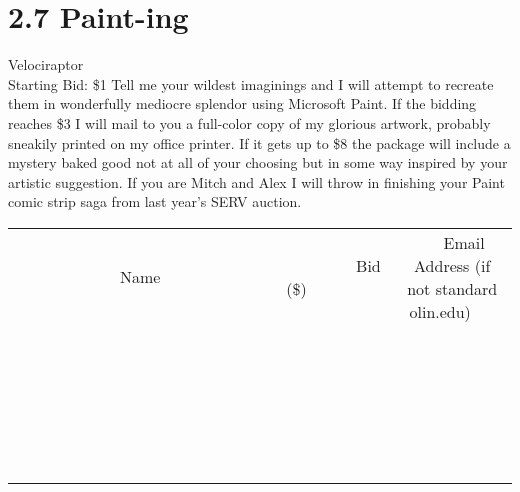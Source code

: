 \documentclass[11pt]{article}
\begin{document}
\section*{2.7 Paint-ing}
Velociraptor
\\
Starting Bid: \$1
\newline
Tell me your wildest imaginings and I will attempt to recreate them in wonderfully mediocre splendor using Microsoft Paint.  If the bidding reaches \$3 I will mail to you a full-color copy of my glorious artwork, probably sneakily printed on my office printer.  If it gets up to \$8 the package will include a mystery baked good not at all of your choosing but in some way inspired by your artistic suggestion. If you are Mitch and Alex I will throw in finishing your Paint comic strip saga from last year's SERV auction.
\\[6ex]
\begin{tabular}{c c c}
~~~~~~~~~~~~~Name~~~~~~~~~~~~~ & ~~~~~~~~~Bid (\$)~~~~~~~~~  & ~~~Email Address (if not standard olin.edu)~~~\\
 & & \\
\hline
 & & \\
\hline
 & & \\
\hline
 & & \\
\hline
 & & \\
\hline
 & & \\
\hline
 & & \\
\hline
 & & \\
\hline
 & & \\
\hline
 & & \\
\hline
 & & \\
\hline
 & & \\
\hline
 & & \\
\hline
 & & \\
\hline
 & & \\
\hline
 & & \\
\hline
 & & \\
\hline
 & & \\
\hline
 & & \\
\hline
 & & \\
\hline
 & & \\
\hline
 & & \\
\hline
 & & \\
\hline
 & & \\
\hline
 & & \\
\hline
 & & \\
\hline
\end{tabular}
\newpage
\end{document}
